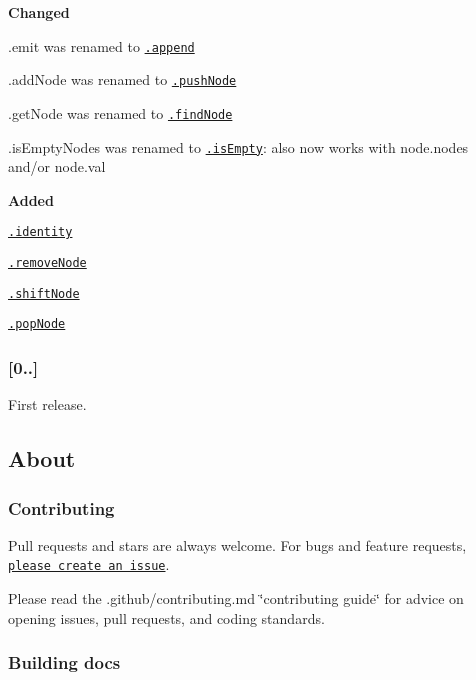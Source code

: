 {\bfseries Changed}


\begin{DoxyItemize}
\item {\ttfamily .emit} was renamed to \href{#append}{\tt .append}
\item {\ttfamily .add\+Node} was renamed to \href{#pushNode}{\tt .push\+Node}
\item {\ttfamily .get\+Node} was renamed to \href{#findNode}{\tt .find\+Node}
\item {\ttfamily .is\+Empty\+Nodes} was renamed to \href{#isEmpty}{\tt .is\+Empty}\+: also now works with {\ttfamily node.\+nodes} and/or {\ttfamily node.\+val}
\end{DoxyItemize}

{\bfseries Added}


\begin{DoxyItemize}
\item \href{#identity}{\tt .identity}
\item \href{#removeNode}{\tt .remove\+Node}
\item \href{#shiftNode}{\tt .shift\+Node}
\item \href{#popNode}{\tt .pop\+Node}
\end{DoxyItemize}

\subsubsection*{\mbox{[}0..\mbox{]}}

First release.

\subsection*{About}

\subsubsection*{Contributing}

Pull requests and stars are always welcome. For bugs and feature requests, \href{../../issues/new}{\tt please create an issue}.

Please read the .github/contributing.\+md \char`\"{}contributing guide\char`\"{} for advice on opening issues, pull requests, and coding standards.

\subsubsection*{Building docs}

